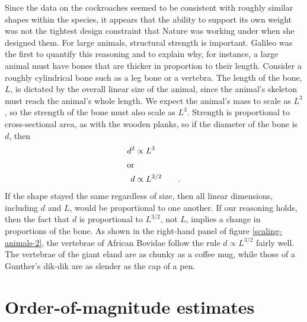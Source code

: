 Since the data on the cockroaches seemed to be consistent
with roughly similar shapes within the species, it appears
that the ability to support its own weight was not the
tightest design constraint that Nature was working under
when she designed them. For large animals, structural
strength is important. Galileo was the first to quantify
this reasoning and to explain why, for instance, a large
animal must have bones that are thicker in proportion to
their length. Consider a roughly cylindrical bone such as a
leg bone or a vertebra. The length of the
bone, $L$, is dictated by the overall linear size of the
animal, since the animal's skeleton must reach the animal's
whole length. We expect the animal's mass to scale as $L^3$,
so the strength of the bone must also scale as $L^3$.
Strength is proportional to cross-sectional area, as with
the wooden planks, so if the diameter of the bone is $d$, then
\begin{align*}
 d^2 &\propto L^3 \\
\intertext{or}
 d &\propto L^{3/2} \qquad .
\end{align*}
If the shape stayed the same regardless of size, then all
linear dimensions, including $d$ and $L$, would be
proportional to one another. If our reasoning holds, then
the fact that $d$ is proportional to $L^{3/2}$, not $L$, implies
a change in proportions of the bone. As shown in the right-hand
panel of figure \ref{scaling-animals-2},
the vertebrae of African Bovidae
follow the rule $d\propto L^{3/2}$ fairly well. The vertebrae
of the giant eland are as chunky as a coffee mug, while
those of a Gunther's dik-dik are as slender as the cap of a pen.





\section{Order-of-magnitude estimates}

